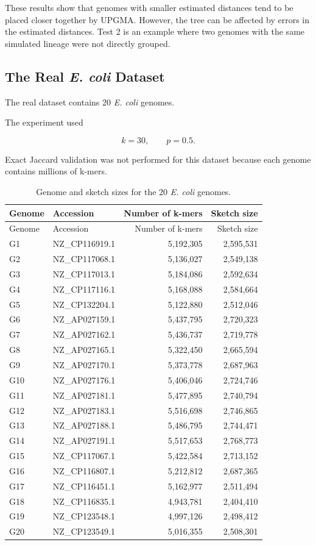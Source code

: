 \documentclass[11pt,a4paper]{article}
\begin{document}
These results show that genomes with smaller estimated distances tend to be
placed closer together by UPGMA. However, the tree can be affected by errors
in the estimated distances. Test 2 is an example where two genomes with the
same simulated lineage were not directly grouped.


\subsection{The Real \textit{E. coli} Dataset}

The real dataset contains 20 \textit{E. coli} genomes.

The experiment used

\[
k=30,\qquad p=0.5.
\]

Exact Jaccard validation was not performed for this dataset because each
genome contains millions of k-mers.

\begin{longtable}{llrr}
\caption{Genome and sketch sizes for the 20 \textit{E. coli} genomes.}
\\
\toprule
Genome & Accession & Number of k-mers & Sketch size\\
\midrule
\endfirsthead

\toprule
Genome & Accession & Number of k-mers & Sketch size\\
\midrule
\endhead

G1&NZ\_CP116919.1&5,192,305&2,595,531\\
G2&NZ\_CP117068.1&5,136,027&2,549,138\\
G3&NZ\_CP117013.1&5,184,086&2,592,634\\
G4&NZ\_CP117116.1&5,168,088&2,584,664\\
G5&NZ\_CP132204.1&5,122,880&2,512,046\\
G6&NZ\_AP027159.1&5,437,795&2,720,323\\
G7&NZ\_AP027162.1&5,436,737&2,719,778\\
G8&NZ\_AP027165.1&5,322,450&2,665,594\\
G9&NZ\_AP027170.1&5,373,778&2,687,963\\
G10&NZ\_AP027176.1&5,406,046&2,724,746\\
G11&NZ\_AP027181.1&5,477,895&2,740,794\\
G12&NZ\_AP027183.1&5,516,698&2,746,865\\
G13&NZ\_AP027188.1&5,486,795&2,744,471\\
G14&NZ\_AP027191.1&5,517,653&2,768,773\\
G15&NZ\_CP117067.1&5,422,584&2,713,152\\
G16&NZ\_CP116807.1&5,212,812&2,687,365\\
G17&NZ\_CP116451.1&5,162,977&2,511,494\\
G18&NZ\_CP116835.1&4,943,781&2,404,410\\
G19&NZ\_CP123548.1&4,997,126&2,498,412\\
G20&NZ\_CP123549.1&5,016,355&2,508,301\\

\bottomrule
\end{longtable}
\end{document}
